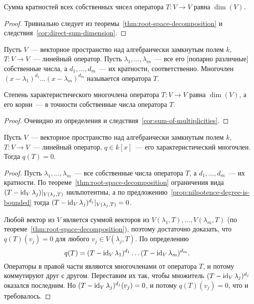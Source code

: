 \begin{corollary}\label{cor:sum-of-multiplicities}
Сумма кратностей всех собственных чисел оператора $T\colon V\to V$ равна $\dim(V)$.
\end{corollary}
\begin{proof}
Тривиально следует из теоремы~\ref{thm:root-space-decomposition}
и следствия~\ref{cor:direct-sum-dimension}.
\end{proof}

\begin{definition}
Пусть $V$~--- векторное пространство над алгебраически замкнутым полем $k$,
$T\colon V\to V$~--- линейный оператор. Пусть $\lambda_1,\dots,\lambda_m$~--- все его
[попарно различные] собственные числа, а $d_1,\dots,d_m$~--- их кратности, соответственно.
Многочлен $(x-\lambda_1)^{d_1}\dots(x-\lambda_m)^{d_m}$ называется
 оператора $T$.
\end{definition}
\begin{proposition}\label{prop:degree-and-roots-of-char-poly}
Степень характеристического многочлена оператора $T\colon V\to V$ равна $\dim(V)$,
а его корни~--- в точности собственные числа оператора $T$.
\end{proposition}
\begin{proof}
Очевидно из определения и следствия~\ref{cor:sum-of-multiplicities}.
\end{proof}

\begin{theorem}\label{thm:cayley-hamilton}
Пусть $V$~--- векторное пространство над алгебраически замкнутым полем $k$,
$T\colon V\to V$~--- линейный оператор, $q\in k[x]$~--- его характеристический многочлен.
Тогда $q(T) = 0$.
\end{theorem}
\begin{proof}
Пусть $\lambda_1,\dots,\lambda_m$~--- все собственные числа оператора $T$,
а $d_1,\dots,d_m$~--- их кратности. По теореме~\ref{thm:root-space-decomposition}
ограничения вида $(T-\operatorname{id}_V\lambda_j)|_{V(\lambda_j,T)}$ нильпотентны,
а по предложению~\ref{prop:nilpotence-degree-is-bounded} тогда
$(T-\operatorname{id}_V\lambda_j)^{d_j}|_{V(\lambda_j,T)} = 0$.

Любой вектор из $V$ является суммой векторов из $V(\lambda_1,T),\dots,V(\lambda_m,T)$
(по теореме~\ref{thm:root-space-decomposition}), поэтому достаточно доказать,
что $q(T)(v_j)=0$ для любого $v_j\in V(\lambda_j,T)$.
По определению
$$
q(T) = (T-\operatorname{id}_V\lambda_1)^{d_1}\dots (T-\operatorname{id}_V\lambda_m)^{d_m}.
$$
Операторы в правой части являются многочленами от оператора $T$, и потому коммутируют
друг с другом. Переставим их так, чтобы множитель $(T-\operatorname{id}_V\lambda_j)^{d_j}$ оказался
последним. Но $(T-\operatorname{id}_V\lambda_j)^{d_j}(v_j)=0$, и потому $q(T)(v_j)=0$,
что и требовалось.
\end{proof}

